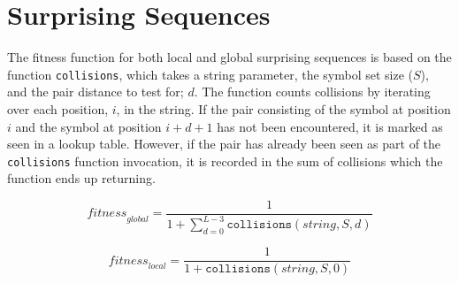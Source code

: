\section*{Surprising Sequences}

The fitness function for both local and global surprising sequences is based on the function \texttt{collisions}, which takes a string parameter, the symbol set size ($S$), and the pair distance to test for; $d$. The function counts collisions by iterating over each position, $i$, in the string. If the pair consisting of the symbol at position $i$ and the symbol at position $i+d+1$ has not been encountered, it is marked as seen in a lookup table. However, if the pair has already been seen as part of the \texttt{collisions} function invocation, it is recorded in the sum of collisions which the function ends up returning.

\begin{equation}
\textit{fitness}_\textit{global} = \frac{1}{1 + \sum_{d=0}^{L - 3} \texttt{collisions}(\textit{string}, S, d)}
\end{equation}

\begin{equation}
\textit{fitness}_\textit{local} = \frac{1}{1 + \texttt{collisions}(\textit{string}, S, 0)}
\end{equation}

